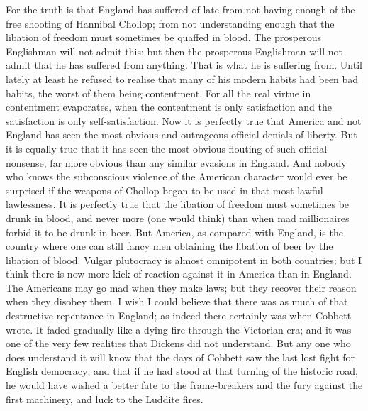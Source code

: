 \documentclass{book}
\begin{document}
For the truth is that England has suffered of late from not having enough of the free shooting of Hannibal Chollop; from not understanding enough that the libation of freedom must sometimes be quaffed in blood. The prosperous Englishman will not admit this; but then the prosperous Englishman will not admit that he has suffered from anything. That is what he is suffering from. Until lately at least he refused to realise that many of his modern habits had been bad habits, the worst of them being contentment. For all the real virtue in contentment evaporates, when the contentment is only satisfaction and the satisfaction is only self-satisfaction. Now it is perfectly true that America and not England has seen the most obvious and outrageous official denials of liberty. But it is equally true that it has seen the most obvious flouting of such official nonsense, far more obvious than any similar evasions in England. And nobody who knows the subconscious violence of the American character would ever be surprised if the weapons of Chollop began to be used in that most lawful lawlessness. It is perfectly true that the libation of freedom must sometimes be drunk in blood, and never more (one would think) than when mad millionaires forbid it to be drunk in beer. But America, as compared with England, is the country where one can still fancy men obtaining the libation of beer by the libation of blood. Vulgar plutocracy is almost omnipotent in both countries; but I think there is now more kick of reaction against it in America than in England. The Americans may go mad when they make laws; but they recover their reason when they disobey them. I wish I could believe that there was as much of that destructive repentance in England; as indeed there certainly was when Cobbett wrote. It faded gradually like a dying fire through the Victorian era; and it was one of the very few realities that Dickens did not understand. But any one who does understand it will know that the days of Cobbett saw the last lost fight for English democracy; and that if he had stood at that turning of the historic road, he would have wished a better fate to the frame-breakers and the fury against the first machinery, and luck to the Luddite fires.
\end{document}
